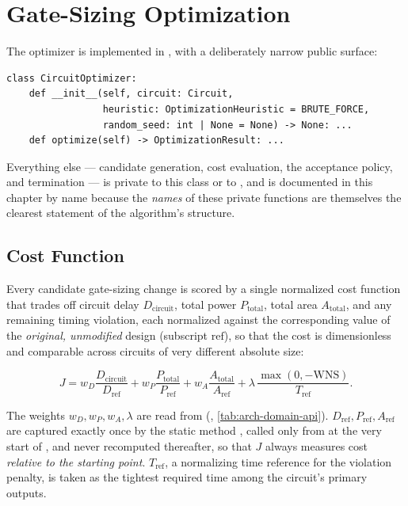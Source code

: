 \chapter{Gate-Sizing Optimization}
\label{ch:optimization}

The optimizer is implemented in
, with a deliberately
narrow public surface:

\begin{lstlisting}[style=pythonstyle, numbers=none]
class CircuitOptimizer:
    def __init__(self, circuit: Circuit,
                 heuristic: OptimizationHeuristic = BRUTE_FORCE,
                 random_seed: int | None = None) -> None: ...
    def optimize(self) -> OptimizationResult: ...
\end{lstlisting}

Everything else --- candidate generation, cost evaluation, the acceptance
policy, and termination --- is private to this class or to
, and is documented in this chapter by
name because the \emph{names} of these private functions are themselves
the clearest statement of the algorithm's structure.

\section{Cost Function}
\label{sec:opt-cost}

Every candidate gate-sizing change is scored by a single normalized cost
function that trades off circuit delay $D_{\mathrm{circuit}}$, total power
$P_{\mathrm{total}}$, total area $A_{\mathrm{total}}$, and any remaining
timing violation, each normalized against the corresponding value of the
\emph{original, unmodified} design (subscript $\mathrm{ref}$), so that the
cost is dimensionless and comparable across circuits of very different
absolute size:

\begin{equation}
    J = w_D \frac{D_{\mathrm{circuit}}}{D_{\mathrm{ref}}}
      + w_P \frac{P_{\mathrm{total}}}{P_{\mathrm{ref}}}
      + w_A \frac{A_{\mathrm{total}}}{A_{\mathrm{ref}}}
      + \lambda\, \frac{\max(0, -\mathrm{WNS})}{T_{\mathrm{ref}}}.
    \label{eq:cost}
\end{equation}

The weights $w_D, w_P, w_A, \lambda$ are read from
 (,
\cref{tab:arch-domain-api}). $D_{\mathrm{ref}}, P_{\mathrm{ref}},
A_{\mathrm{ref}}$ are captured exactly once by the static method
, called only from  at
the very start of , and never recomputed thereafter, so
that $J$ always measures cost \emph{relative to the starting point}.
$T_{\mathrm{ref}}$, a normalizing time reference for the violation penalty,
is taken as the tightest required time among the circuit's primary outputs.

